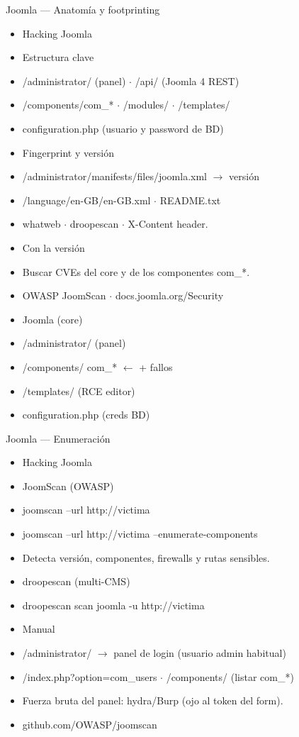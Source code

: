 \documentclass[aspectratio=169,10pt]{beamer}
\begin{document}
\begin{frame}[allowframebreaks]{Joomla --- Anatomía y footprinting}
\small
  \begin{itemize}
  \item Hacking Joomla
  \item Estructura clave
  \item /administrator/ (panel) $\cdot$ /api/ (Joomla 4 REST)
  \item /components/com\_* $\cdot$ /modules/ $\cdot$ /templates/
  \item configuration.php (usuario y password de BD)
  \item Fingerprint y versión
  \item /administrator/manifests/files/joomla.xml $\rightarrow$ versión
  \item /language/en-GB/en-GB.xml $\cdot$ README.txt
  \item whatweb $\cdot$ droopescan $\cdot$ X-Content header.
  \item Con la versión
  \item Buscar CVEs del core y de los componentes com\_*.
  \item OWASP JoomScan $\cdot$ docs.joomla.org/Security
  \item Joomla (core)
  \item /administrator/ (panel)
  \item /components/ com\_* $\leftarrow$ + fallos
  \item /templates/ (RCE editor)
  \item configuration.php (creds BD)
  \end{itemize}
\end{frame}

\begin{frame}[allowframebreaks]{Joomla --- Enumeración}
\small
  \begin{itemize}
  \item Hacking Joomla
  \item JoomScan (OWASP)
  \item joomscan --url http://victima
  \item joomscan --url http://victima --enumerate-components
  \item Detecta versión, componentes, firewalls y rutas sensibles.
  \item droopescan (multi-CMS)
  \item droopescan scan joomla -u http://victima
  \item Manual
  \item /administrator/ $\rightarrow$ panel de login (usuario admin habitual)
  \item /index.php?option=com\_users $\cdot$ /components/ (listar com\_*)
  \item Fuerza bruta del panel: hydra/Burp (ojo al token del form).
  \item github.com/OWASP/joomscan
  \end{itemize}
\end{frame}
\end{document}
